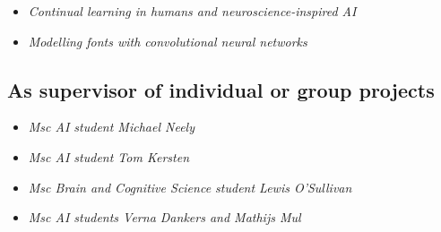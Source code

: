 {{{{{{{{{
{\begin{itemize}
  \item[] \textit{Continual learning in humans and neuroscience-inspired AI}
\end{itemize}}}

{
{\begin{itemize}
  \item[] \textit{Modelling fonts with convolutional neural networks}
\end{itemize}}}

\vspace{1mm}

\subsection{As supervisor of individual or group projects}

{
{\begin{itemize}
  \item[] \textit{Msc AI student Michael Neely}
\end{itemize}}}

{
{\begin{itemize}
  \item[] \textit{Msc AI student Tom Kersten}
\end{itemize}}}


{
{\begin{itemize}
  \item[] \textit{Msc Brain and Cognitive Science student Lewis O'Sullivan}
\end{itemize}}}

{
{\begin{itemize}
  \item[] \textit{Msc AI students Verna Dankers and Mathijs Mul}
\end{itemize}}}

}}}}}}}}
